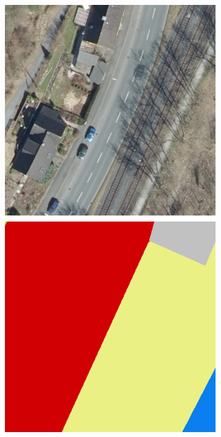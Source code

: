\begin{figure}[h]
\begin{subfigure}{0.22\textwidth}
        \caption{}
        \label{fig:label_considerations_a}
    \end{subfigure}
    \hfill
    \begin{subfigure}{0.22\textwidth}
        \includegraphics[width=\textwidth]{images/consideration_labels/150815}

\end{subfigure}
\end{figure}
